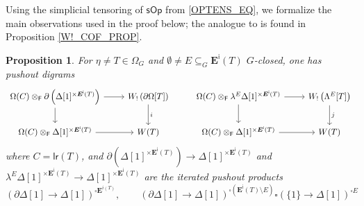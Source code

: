 \documentclass[a4paper,10pt
,draft
]{article}%
\numberwithin{equation}{section}
\numberwithin{figure}{section}
\newtheorem{proposition}[equation]{Proposition}%
\theoremstyle{definition} %
\newtheorem{remark}[equation]{Remark}%
\newcommand{\set}[1]{\left\{#1\right\}}%
\newcommand{\vect}[1]{\text{\overrightharp{\ensuremath{#1}}}}
\newcommand{\sOp}{\ensuremath{\mathsf{sOp}}}%
\newcommand{\1}{\ensuremath{\mathbbm 1}}%
\begin{document}
Using the simplicial tensoring of $\sOp$ from \eqref{OPTENS_EQ},
we formalize the main observations used in the proof \cite[Prop. 4.5]{CM13b} below;
the analogue to \cite[Prop. 4.8]{CM13b} is found in Proposition \ref{W!_COF_PROP}.
\begin{proposition}
      \label{WLEFTQPUSH PROP}
      For $\eta \neq T \in \Omega_G$
      and $\emptyset \neq E \subseteq_G \boldsymbol{E}^{\mathsf{i}}(T)$ $G$-closed,
      one has pushout digrams
\begin{equation}\label{WLEFTQPUSH_EQ}
	\begin{tikzcd}
		\Omega(C) \otimes_{\mathsf{F}}
		\partial \left(\Delta[1]^{\times \boldsymbol{E}^{\mathsf{i}}(T)}\right)
		\ar{r} \ar{d}
	&
		W_! \left(\partial \Omega[T]\right) 
		\arrow[d, "i"]
	& %
		\Omega(C) \otimes_{\mathsf{F}}
		\lambda^E \Delta[1]^{\times \boldsymbol{E}^{\mathsf{i}}(T)}
		\ar{r} \ar{d}
	&
		W_! \left(\Lambda^E[T]\right) 
		\arrow[d, "j"]
\\
		\Omega(C) \otimes_{\mathsf{F}}
		\Delta[1]^{\times \boldsymbol{E}^{\mathsf{i}}(T)}
		\ar{r}
	&
		W(T)
	& %
		\Omega(C) \otimes_{\mathsf{F}}
		\Delta[1]^{\times \boldsymbol{E}^{\mathsf{i}}(T)}
		\ar{r}
	&
		W(T)
	\end{tikzcd}
\end{equation}
      where
      $C = \mathsf{lr}(T)$, and
      $\partial \left(\Delta[1]^{\times \boldsymbol{E}^{\mathsf{i}}(T)}\right)
      \to
      \Delta[1]^{\times \boldsymbol{E}^{\mathsf{i}}(T)}$
      and
      $\lambda^E \Delta[1]^{\times \boldsymbol{E}^{\mathsf{i}}(T)}
      \to \Delta[1]^{\times \boldsymbol{E}^{\mathsf{i}}(T)}$
      are the iterated pushout products
      \[
            \left(
                  \partial\Delta[1] \to \Delta[1]
            \right)^{\square \boldsymbol E^{i(T)}},
            \qquad
            \left(
                  \partial \Delta[1] \to \Delta[1]
            \right)^{\square (\boldsymbol{E}^{\mathsf{i}}(T) \setminus E)}
            \square
            \left(
                  \{1\} \to \Delta[1]
            \right)^{\square E}
      \]
\end{proposition}
\end{document}
